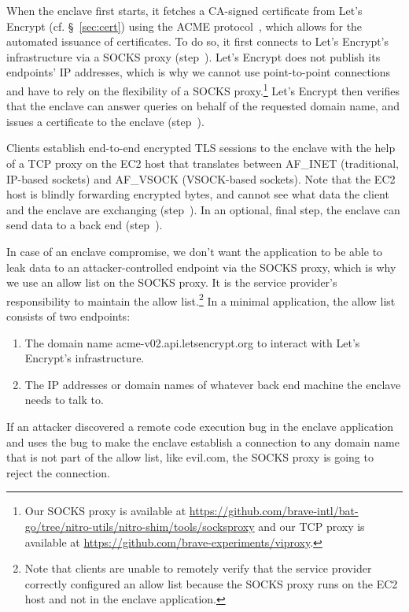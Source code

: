 When the enclave first starts, it fetches a CA-signed certificate from Let's
Encrypt (cf. \S~\ref{sec:cert}) using the ACME protocol~\cite{acme-protocol},
which allows for the automated issuance of certificates.  To do so, it first
connects to Let's Encrypt's infrastructure via a SOCKS proxy (step~).
Let's Encrypt does not publish its endpoints' IP addresses, which is why we
cannot use point-to-point connections and have to rely on the flexibility of a
SOCKS proxy.\footnote{Our SOCKS proxy is available at
\url{https://github.com/brave-intl/bat-go/tree/nitro-utils/nitro-shim/tools/socksproxy}
and our TCP proxy is available at
\url{https://github.com/brave-experiments/viproxy}.} Let's Encrypt then verifies
that the enclave can answer queries on behalf of the requested domain name, and
issues a certificate to the enclave (step~).

Clients establish end-to-end encrypted TLS sessions to the enclave with the help
of a TCP proxy on the EC2 host that translates between AF\_INET (traditional,
IP-based sockets) and AF\_VSOCK (VSOCK-based sockets).  Note that the EC2 host
is blindly forwarding encrypted bytes, and cannot see what data the client and
the enclave are exchanging (step~).  In an optional, final step, the
enclave can send data to a back end (step~).

In case of an enclave compromise, we don't want the application to be able to
leak data to an attacker-controlled endpoint via the SOCKS proxy, which is why
we use an allow list on the SOCKS proxy.  It is the service provider's
responsibility to maintain the allow list.\footnote{Note that clients are unable
to remotely verify that the service provider correctly configured an allow list
because the SOCKS proxy runs on the EC2 host and not in the enclave
application.}  In a minimal application, the allow list consists of two
endpoints:

\begin{enumerate}
    \item The domain name acme-v02.api.letsencrypt.org to interact with Let's
      Encrypt's infrastructure.
    \item The IP addresses or domain names of whatever back end machine the
      enclave needs to talk to.
\end{enumerate}

If an attacker discovered a remote code execution bug in the enclave application
and uses the bug to make the enclave establish a connection to any domain name
that is not part of the allow list, like evil.com, the SOCKS proxy is going to
reject the connection.


